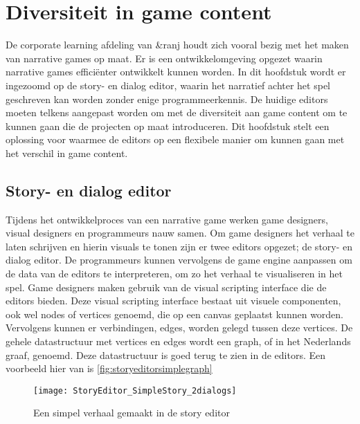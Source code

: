 \chapter{Diversiteit in game content}
De corporate learning afdeling van \&ranj houdt zich vooral bezig met het maken van narrative games op maat. Er is een ontwikkelomgeving opgezet waarin narrative games efficiënter ontwikkelt kunnen worden. In dit hoofdstuk wordt er ingezoomd op de story- en dialog editor, waarin het narratief achter het spel geschreven kan worden zonder enige programmeerkennis. 
De huidige editors moeten telkens aangepast worden om met de diversiteit aan game content om te kunnen gaan die de projecten op maat introduceren. Dit hoofdstuk stelt een oplossing voor waarmee de editors op een flexibele manier om kunnen gaan met het verschil in game content.

\section{Story- en dialog editor}
Tijdens het ontwikkelproces van een narrative game werken game designers, visual designers en programmeurs nauw samen. Om game designers het verhaal te laten schrijven en hierin visuals te tonen zijn er twee editors opgezet; de story- en dialog editor. De programmeurs kunnen vervolgens de game engine aanpassen om de data van de editors te interpreteren, om zo het verhaal te visualiseren in het spel.
Game designers maken gebruik van de visual scripting interface die de editors bieden. Deze visual scripting interface bestaat uit visuele componenten, ook wel nodes of vertices genoemd, die op een canvas geplaatst kunnen worden. Vervolgens kunnen er verbindingen, edges, worden gelegd tussen deze vertices. De gehele datastructuur met vertices en edges wordt een graph, of in het Nederlands graaf, genoemd\cite{Aho1983}. Deze datastructuur is goed terug te zien in de editors. Een voorbeeld hier van is \autoref{fig:storyeditorsimplegraph}

\begin{figure}[htb]
    \texttt{[image: StoryEditor\_SimpleStory\_2dialogs]}
    \caption{Een simpel verhaal gemaakt in de story editor}
    \label{fig:storyeditorsimplegraph}
    \centering
\end{figure}

